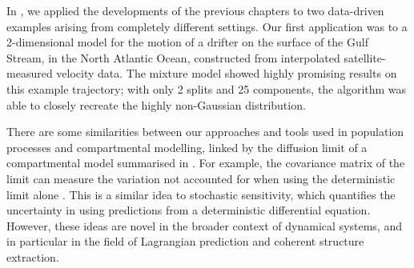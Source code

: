 In , we applied the developments of the previous chapters to two data-driven examples arising from completely different settings.
Our first application was to a 2-dimensional model for the motion of a drifter on the surface of the Gulf Stream, in the North Atlantic Ocean, constructed from interpolated satellite-measured velocity data.
The mixture model showed highly promising results on this example trajectory; with only 2 splits and 25 components, the algorithm was able to closely recreate the highly non-Gaussian distribution.


There are some similarities between our approaches and tools used in population processes and compartmental modelling, linked by the diffusion limit of a compartmental model summarised in .
For example, the covariance matrix of the limit can measure the variation not accounted for when using the deterministic limit alone \citep{PollettEtAl_2010_ModellingPopulationProcesses}.
This is a similar idea to stochastic sensitivity, which quantifies the uncertainty in using predictions from a deterministic differential equation.
However, these ideas are novel in the broader context of dynamical systems, and in particular in the field of Lagrangian prediction and coherent structure extraction.




